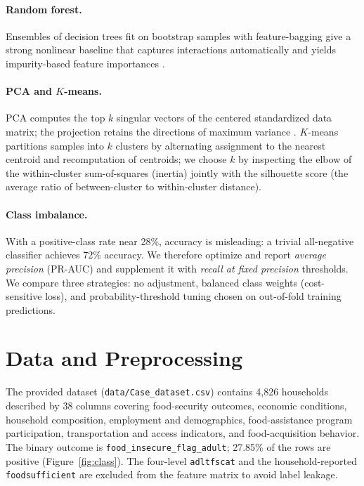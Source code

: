 \documentclass[10pt,letterpaper]{article}
\begin{document}
\paragraph{Random forest.}
Ensembles of decision trees fit on bootstrap samples with
feature-bagging give a strong nonlinear baseline that captures
interactions automatically and yields impurity-based feature
importances \cite{murphy2022}.

\paragraph{PCA and $K$-means.}
PCA computes the top $k$ singular vectors of the centered standardized
data matrix; the projection retains the directions of maximum variance
\cite{boyd2018}.  $K$-means partitions samples into $k$ clusters by
alternating assignment to the nearest centroid and recomputation of
centroids; we choose $k$ by inspecting the elbow of the within-cluster
sum-of-squares (inertia) jointly with the silhouette score (the
average ratio of between-cluster to within-cluster distance).

\paragraph{Class imbalance.}
With a positive-class rate near 28\%, accuracy is misleading: a
trivial all-negative classifier achieves 72\% accuracy.  We therefore
optimize and report \emph{average precision} (PR-AUC) and supplement
it with \emph{recall at fixed precision} thresholds.  We compare three
strategies: no adjustment, balanced class weights (cost-sensitive
loss), and probability-threshold tuning chosen on out-of-fold training
predictions.

\section{Data and Preprocessing}
\label{sec:data}

The provided dataset
(\texttt{data/Case\_dataset.csv}) contains
4{,}826 households described by 38 columns covering food-security
outcomes, economic conditions, household composition, employment and
demographics, food-assistance program participation, transportation
and access indicators, and food-acquisition behavior.  The binary
outcome is \texttt{food\_insecure\_flag\_adult}; 27.85\% of the rows
are positive (Figure~\ref{fig:class}).  The four-level
\texttt{adltfscat} and the household-reported \texttt{foodsufficient}
are excluded from the feature matrix to avoid label leakage.
\end{document}
